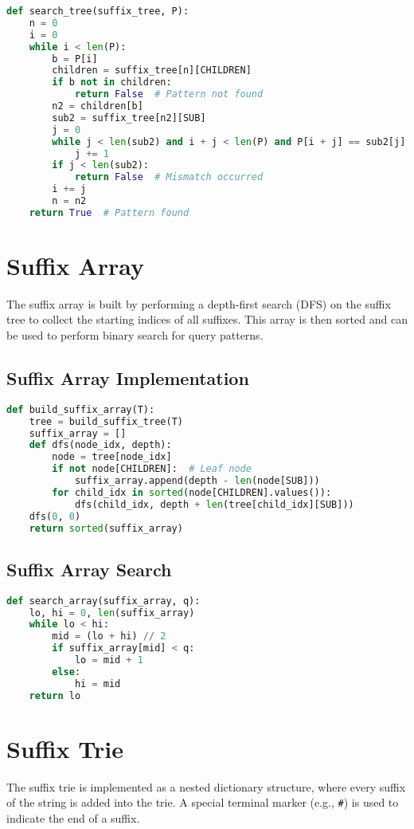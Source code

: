 \documentclass{article}
\begin{document}
\begin{lstlisting}[language=Python, caption=search_tree]
def search_tree(suffix_tree, P):
    n = 0
    i = 0
    while i < len(P):
        b = P[i]
        children = suffix_tree[n][CHILDREN]
        if b not in children:
            return False  # Pattern not found
        n2 = children[b]
        sub2 = suffix_tree[n2][SUB]
        j = 0
        while j < len(sub2) and i + j < len(P) and P[i + j] == sub2[j]:
            j += 1
        if j < len(sub2):
            return False  # Mismatch occurred
        i += j
        n = n2
    return True  # Pattern found
\end{lstlisting}

\section{Suffix Array}
The suffix array is built by performing a depth-first search (DFS) on the suffix tree to collect the starting indices of all suffixes. This array is then sorted and can be used to perform binary search for query patterns.

\subsection{Suffix Array Implementation}
\begin{lstlisting}[language=Python, caption=build_suffix_array]
def build_suffix_array(T):
    tree = build_suffix_tree(T)
    suffix_array = []
    def dfs(node_idx, depth):
        node = tree[node_idx]
        if not node[CHILDREN]:  # Leaf node
            suffix_array.append(depth - len(node[SUB]))
        for child_idx in sorted(node[CHILDREN].values()):
            dfs(child_idx, depth + len(tree[child_idx][SUB]))
    dfs(0, 0)
    return sorted(suffix_array)
\end{lstlisting}

\subsection{Suffix Array Search}
\begin{lstlisting}[language=Python, caption=search_array]
def search_array(suffix_array, q):
    lo, hi = 0, len(suffix_array)
    while lo < hi:
        mid = (lo + hi) // 2
        if suffix_array[mid] < q:
            lo = mid + 1
        else:
            hi = mid
    return lo
\end{lstlisting}

\section{Suffix Trie}
The suffix trie is implemented as a nested dictionary structure, where every suffix of the string is added into the trie. A special terminal marker (e.g., \texttt{\#}) is used to indicate the end of a suffix.
\end{document}
